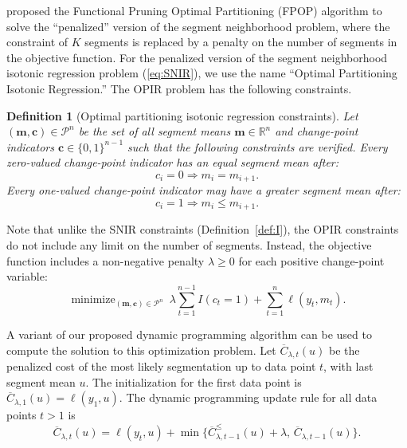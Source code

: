 \documentclass{article}
\newtheorem{definition}{Definition}
\DeclareMathOperator*{\minimize}{minimize}
\newcommand{\RR}{\mathbb R}
\begin{document}
\citet{FPOP} proposed the Functional Pruning Optimal Partitioning
(FPOP) algorithm to solve the ``penalized'' version of the segment
neighborhood problem, where the constraint of $K$ segments is replaced
by a penalty on the number of segments in the objective function. For
the penalized version of the segment neighborhood isotonic regression
problem (\ref{eq:SNIR}), we use the name ``Optimal Partitioning
Isotonic Regression.'' The OPIR problem has the following constraints.
\begin{definition}[Optimal partitioning isotonic regression constraints]
  \label{def:P}
  Let $(\mathbf m, \mathbf c)\in\mathcal P^n$ be the set of all segment means
  $\mathbf m\in\RR^n$ and change-point indicators
  $\mathbf c\in\{0,1\}^{n-1}$ such that the following constraints are
  verified. 
  Every zero-valued change-point indicator has an equal segment mean
  after:
  \begin{equation}
    \label{eq:P_0}
    c_i = 0 \Rightarrow m_i = m_{i+1}.
  \end{equation}
  Every one-valued change-point indicator may have a greater segment
  mean after:
  \begin{equation}
    \label{eq:P_1}
    c_i = 1 \Rightarrow m_i \leq m_{i+1}.
  \end{equation}
\end{definition}
Note that unlike the SNIR constraints (Definition~\ref{def:I}), the
OPIR constraints do not include any limit on the number of
segments. Instead, the objective function includes a non-negative penalty
$\lambda\geq 0$ for each positive change-point variable:
\begin{equation}
    \minimize_{
        (\mathbf m, \mathbf c)\in\mathcal P^n
      } \ 
\lambda\sum_{t=1}^{n-1} I(c_t =1)
+
\sum_{t=1}^n \ell(y_t, m_t).
\end{equation}

A variant of our proposed dynamic programming algorithm can be used to compute the
solution to this optimization problem. Let $\overline C_{\lambda,t}(u)$ be the
penalized cost of the most likely segmentation up to data point $t$,
with last segment mean $u$. The initialization for the first data
point is $\overline C_{\lambda,1}(u) = \ell(y_1, u)$. The dynamic programming update rule
for all data points $t>1$ is
\begin{equation}
  \overline C_{\lambda,t}(u) = \ell(y_t, u) + \min\{
  \overline C_{\lambda,t-1}^\leq(u) + \lambda,\, \overline C_{\lambda,t-1}(u)
  \}.
\end{equation}
\end{document}
